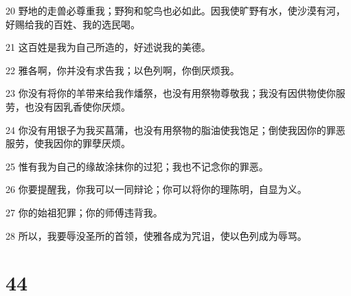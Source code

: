 \par 20 野地的走兽必尊重我；野狗和鸵鸟也必如此。因我使旷野有水，使沙漠有河，好赐给我的百姓、我的选民喝。
\par 21 这百姓是我为自己所造的，好述说我的美德。
\par 22 雅各啊，你并没有求告我；以色列啊，你倒厌烦我。
\par 23 你没有将你的羊带来给我作燔祭，也没有用祭物尊敬我；我没有因供物使你服劳，也没有因乳香使你厌烦。
\par 24 你没有用银子为我买菖蒲，也没有用祭物的脂油使我饱足；倒使我因你的罪恶服劳，使我因你的罪孽厌烦。
\par 25 惟有我为自己的缘故涂抹你的过犯；我也不记念你的罪恶。
\par 26 你要提醒我，你我可以一同辩论；你可以将你的理陈明，自显为义。
\par 27 你的始祖犯罪；你的师傅违背我。
\par 28 所以，我要辱没圣所的首领，使雅各成为咒诅，使以色列成为辱骂。

\chapter{44}

